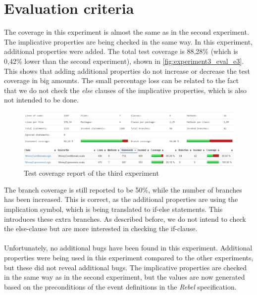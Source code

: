 \section{Evaluation criteria}
The coverage in this experiment is almost the same as in the second experiment.
The implicative properties are being checked in the same way. In this
experiment, additional properties were added. The total test coverage is 88,28\%
(which is 0,42\% lower than the second experiment), shown in
\autoref{fig:experiment3_eval_e3}. This shows that adding additional properties
do not increase or decrease the test coverage in big amounts. The small
percentage loss can be related to the fact that we do not check the
\textit{else} clauses of the implicative properties, which is also not intended
to be done.
\begin{figure}[!ht]
	\includegraphics[width=\linewidth]{figures/eval_e3}
\caption{Test coverage report of the third experiment}
\label{fig:experiment3_eval_e3}
\centering
\end{figure}
\FloatBarrier\noindent
The branch coverage is still reported to be 50\%, while the number of branches
has been increased. This is correct, as the additional properties are using the
implication symbol, which is being translated to if-else statements. This
introduces these extra branches. As described before, we do not intend to check
the else-clause but are more interested in checking the if-clause.\\
\\
Unfortunately, no additional bugs have been found in this experiment. Additional
properties were being used in this experiment compared to the other experiments,
but these did not reveal additional bugs. The implicative properties are checked
in the same way as in the second experiment, but the values are now generated
based on the preconditions of the event definitions in the \textit{Rebel}
specification.\\
\\
